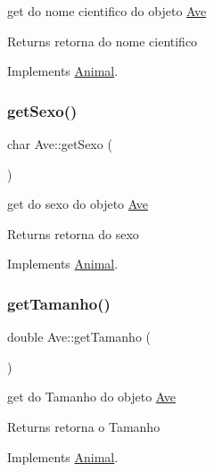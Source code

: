 get do nome cientifico do objeto \mbox{\hyperlink{class_ave}{Ave}} 

\begin{DoxyReturn}{Returns}
retorna do nome cientifico 
\end{DoxyReturn}


Implements \mbox{\hyperlink{class_animal}{Animal}}.

\mbox{\label{class_ave_aedb2458d9a3ef0c05657aa9d3791167d}} 
\subsubsection{\texorpdfstring{getSexo()}{getSexo()}}
{\footnotesize\ttfamily char Ave\+::get\+Sexo (\begin{DoxyParamCaption}{ }\end{DoxyParamCaption})\hspace{0.3cm}{\ttfamily [virtual]}}



get do sexo do objeto \mbox{\hyperlink{class_ave}{Ave}} 

\begin{DoxyReturn}{Returns}
retorna do sexo 
\end{DoxyReturn}


Implements \mbox{\hyperlink{class_animal}{Animal}}.

\mbox{\label{class_ave_a43030ccb3e8297b74c7a38184055730f}} 
\subsubsection{\texorpdfstring{getTamanho()}{getTamanho()}}
{\footnotesize\ttfamily double Ave\+::get\+Tamanho (\begin{DoxyParamCaption}{ }\end{DoxyParamCaption})\hspace{0.3cm}{\ttfamily [virtual]}}



get do Tamanho do objeto \mbox{\hyperlink{class_ave}{Ave}} 

\begin{DoxyReturn}{Returns}
retorna o Tamanho 
\end{DoxyReturn}


Implements \mbox{\hyperlink{class_animal}{Animal}}.

